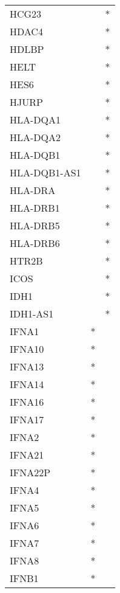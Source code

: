 \begin{longtable}{lcc}
HCG23          &           &       * \\
HDAC4          &           &       * \\
HDLBP          &           &       * \\
HELT           &           &       * \\
HES6           &           &       * \\
HJURP          &           &       * \\
HLA-DQA1       &           &       * \\
HLA-DQA2       &           &       * \\
HLA-DQB1       &           &       * \\
HLA-DQB1-AS1   &           &       * \\
HLA-DRA        &           &       * \\
HLA-DRB1       &           &       * \\
HLA-DRB5       &           &       * \\
HLA-DRB6       &           &       * \\
HTR2B          &           &       * \\
ICOS           &           &       * \\
IDH1           &           &       * \\
IDH1-AS1       &           &       * \\
IFNA1          &         * &         \\
IFNA10         &         * &         \\
IFNA13         &         * &         \\
IFNA14         &         * &         \\
IFNA16         &         * &         \\
IFNA17         &         * &         \\
IFNA2          &         * &         \\
IFNA21         &         * &         \\
IFNA22P        &         * &         \\
IFNA4          &         * &         \\
IFNA5          &         * &         \\
IFNA6          &         * &         \\
IFNA7          &         * &         \\
IFNA8          &         * &         \\
IFNB1          &         * &         \\

\end{longtable}
